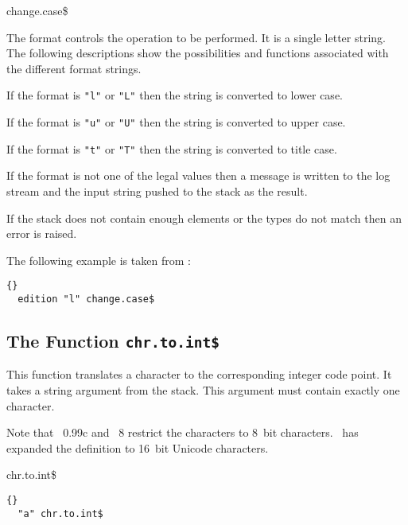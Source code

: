 \begin{BstFunction}{change.case\$}
\end{BstFunction}

The format controls the operation to be performed. It is a single
letter string. The following descriptions show the possibilities and
functions associated with the different format strings.

If the format is \verb|"l"| or \verb|"L"| then the string is converted
to lower case.

If the format is \verb|"u"| or \verb|"U"| then the string is converted
to upper case.

If the format is \verb|"t"| or \verb|"T"| then the string is converted
to title case.

\INCOMPLETE

If the format is not one of the legal values then a message is written
to the log stream and the input string pushed to the stack as the
result.

If the stack does not contain enough elements or the types do not
match then an error is raised.

The following example is taken from :

\begin{lstlisting}{}
  edition "l" change.case$
\end{lstlisting}


\subsection{The Function \texttt{chr.to.int\$}}%

This function translates a character to the corresponding integer code
point. It takes a string argument from the stack. This argument must
contain exactly one character.

Note that \BibTeX~0.99c and
\BibTeX~8 restrict the characters to 8~bit
characters. \ExBib\ has expanded the definition to 16~bit Unicode
characters.

\begin{BstFunction}{chr.to.int\$}
\end{BstFunction}

\begin{lstlisting}{}
  "a" chr.to.int$
\end{lstlisting}


